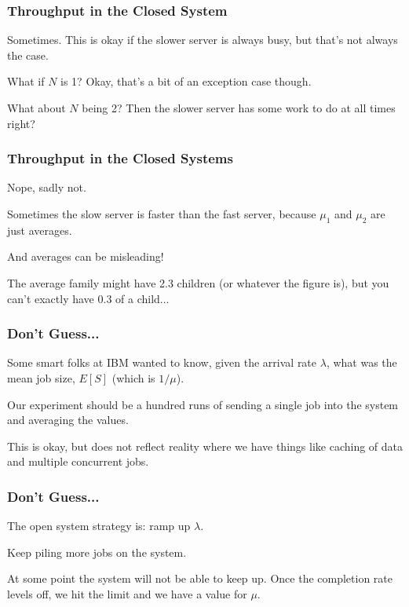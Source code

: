 \begin{frame}
\frametitle{Throughput in the Closed System}



Sometimes. This is okay if the slower server is always busy, but that's not always the case. 

What if $N$ is 1? Okay, that's a bit of an exception case though. 

What about $N$ being 2? Then the slower server has some work to do at all times right?

\end{frame}



\begin{frame}
\frametitle{Throughput in the Closed Systems}

Nope, sadly not. 

Sometimes the slow server is faster than the fast server, because $\mu_{1}$ and $\mu_{2}$ are just averages. 

And averages can be misleading! 

The average family might have 2.3 children (or whatever the figure is), but you can't exactly have 0.3 of a child...

\end{frame}



\begin{frame}
\frametitle{Don't Guess...}
Some smart folks at IBM wanted to know, given the arrival rate $\lambda$, what was the mean job size, $E[S]$ (which is $1/\mu$). 

Our experiment should be a hundred runs of sending a single job into the system and averaging the values. 

This is okay, but does not reflect reality where we have things like caching of data and multiple concurrent jobs. 

\end{frame}



\begin{frame}
\frametitle{Don't Guess...}

The open system strategy is: ramp up $\lambda$. 

Keep piling more jobs on the system. 

At some point the system will not be able to keep up. Once the completion rate levels off, we hit the limit and we have a value for $\mu$.


\end{frame}



